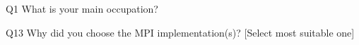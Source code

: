 \begin{description}%
\item{Q1} What is your main occupation?%
\item{Q13} Why did you choose the MPI implementation(s)? [Select most suitable one]%
\end{description}%
